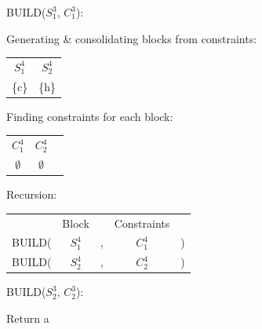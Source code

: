 \documentclass[11pt]{article} %
\begin{document}
	\hspace{0.5cm}BUILD($S_1^3$, $C_1^3$):
		\begin{center}
		Generating \& consolidating blocks from constraints:
		
		\begin{tabular}{c c}
			\hspace{0.8cm}$S_1^4$\hspace{0.8cm} & \hspace{0.8cm}$S_2^4$\hspace{0.8cm} \\
			\{c\} & \{h\}
		\end{tabular}
	
		Finding constraints for each block:
		
		\begin{tabular}{c c c}
			\hspace{0.8cm}$C_1^4$\hspace{0.8cm} & \hspace{0.8cm}$C_2^4$\hspace{0.8cm} \\
			$\emptyset$ & $\emptyset$
		\end{tabular}

		Recursion:
		
		\begin{tabular}{c c c c c}
			 & Block & & Constraints & \\
			BUILD( & $S_1^4$ & , & $C_1^4$ & ) \\
			BUILD( & $S_2^4$ & , & $C_2^4$ & )
		\end{tabular}
		\end{center}

	\hspace{0.5cm}BUILD($S_2^3$, $C_2^3$):
		\begin{center}
		Return a
		\end{center}
\end{document}
